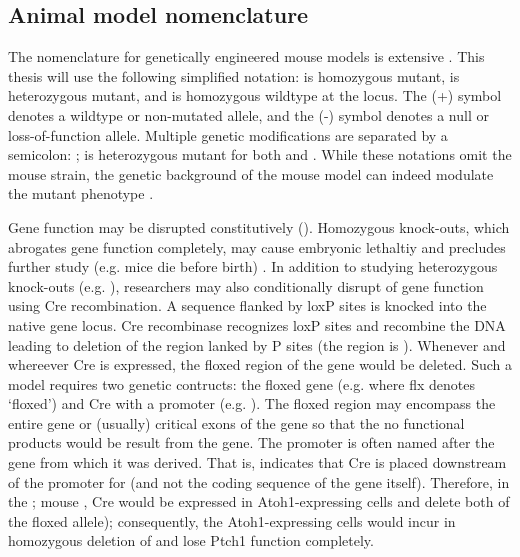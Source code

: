\subsection{Animal model nomenclature}

The nomenclature for genetically engineered mouse models is extensive . This thesis will use the following simplified notation: \high{-/-} is homozygous mutant, \high{+/-} is heterozygous mutant, and \high{+/+} is homozygous wildtype at the  locus. The (+) symbol denotes a wildtype or non-mutated allele, and the (-) symbol denotes a null or loss-of-function allele. Multiple genetic modifications are separated by a semicolon: \high{+/-};\high{+/-} is heterozygous mutant for both  and . While these notations omit the mouse strain, the genetic background of the mouse model can indeed modulate the mutant phenotype .

Gene function may be disrupted constitutively (). Homozygous knock-outs, which abrogates gene function completely, may cause embryonic lethaltiy and precludes further study (e.g. \high{-/-} mice die before birth) . In addition to studying heterozygous knock-outs (e.g. \high{+/-}), researchers may also conditionally disrupt of gene function using Cre recombination. A sequence flanked by loxP sites is knocked into the native gene locus. Cre recombinase recognizes loxP sites and recombine the DNA leading to deletion of the region lanked by P sites (the region is ). Whenever and whereever Cre is expressed, the floxed region of the gene would be deleted. Such a model requires two genetic contructs: the floxed gene (e.g.  where flx denotes `floxed') and Cre with a promoter (e.g. ). The floxed region may encompass the entire gene or (usually) critical exons of the gene so that the no functional products would be result from the gene. The promoter is often named after the gene from which it was derived. That is,  indicates that Cre is placed downstream of the promoter for  (and not the coding sequence of the  gene itself). Therefore, in the ; mouse , Cre would be expressed in Atoh1-expressing cells and delete both of the floxed  allele); consequently, the Atoh1-expressing cells would incur in homozygous deletion of  and lose Ptch1 function completely.
		
